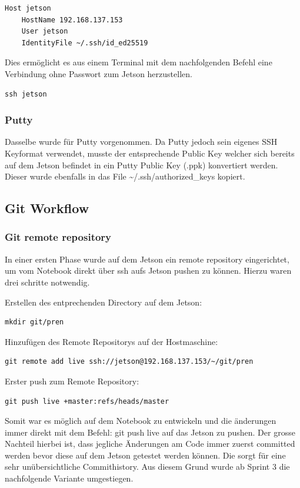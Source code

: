 \begin{verbatim}
Host jetson
	HostName 192.168.137.153
	User jetson
	IdentityFile ~/.ssh/id_ed25519
\end{verbatim}

Dies ermöglicht es aus einem Terminal mit dem nachfolgenden Befehl eine Verbindung ohne Passwort zum Jetson herzustellen.
\begin{verbatim}
ssh jetson
\end{verbatim}

\subsubsection{Putty}
Dasselbe wurde für Putty vorgenommen. Da Putty jedoch sein eigenes SSH Keyformat verwendet, musste der entsprechende Public Key welcher sich bereits auf dem Jetson befindet in ein Putty Public Key (.ppk) konvertiert werden. Dieser wurde ebenfalls in das File \textasciitilde/.ssh/authorized\_keys kopiert. 

\subsection{Git Workflow}
\subsubsection{Git remote repository}
In einer ersten Phase wurde auf dem Jetson ein remote repository eingerichtet, um vom Notebook direkt über ssh aufs Jetson pushen zu können. Hierzu waren drei schritte notwendig.

Erstellen des entprechenden Directory auf dem Jetson:
\begin{verbatim}
mkdir git/pren
\end{verbatim}


Hinzufügen des Remote Repositorys auf der Hostmaschine:
\begin{verbatim}
git remote add live ssh://jetson@192.168.137.153/~/git/pren
\end{verbatim}


Erster push zum Remote Repository:
\begin{verbatim}
git push live +master:refs/heads/master
\end{verbatim}


Somit war es möglich auf dem Notebook zu entwickeln und die änderungen immer direkt mit dem Befehl: git push live auf das Jetson zu pushen. Der grosse Nachteil hierbei ist, dass jegliche Änderungen am Code immer zuerst committed werden bevor diese auf dem Jetson getestet werden können. Die sorgt für eine sehr unübersichtliche Commithistory. Aus diesem Grund wurde ab Sprint 3 die nachfolgende Variante umgestiegen.

